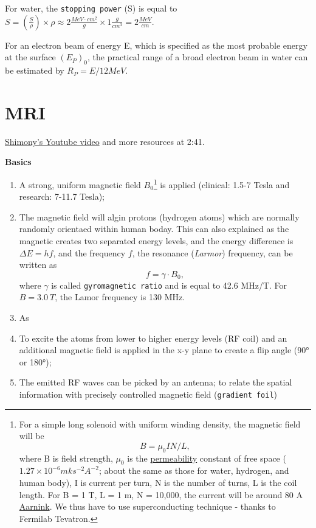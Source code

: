 \documentclass[]{book}
\providecommand{\tightlist}{%
  \setlength{\itemsep}{0pt}\setlength{\parskip}{0pt}}
\let\rmarkdownfootnote\footnote%
\def\footnote{\protect\rmarkdownfootnote}
\theoremstyle{definition}
\theoremstyle{definition}
\theoremstyle{definition}
\theoremstyle{remark}
\begin{document}
For water, the \texttt{stopping\ power} (S) is equal to
\(S = \left(\frac{S}{\rho}\right) \times \rho \approx 2 \frac{MeV\cdot {cm}^2}{g}\times 1 \frac{g}{cm^3} = 2 \frac{MeV}{cm}\).

For an electron beam of energy E, which is specified as the most
probable energy at the surface \((E_P)_0\), the practical range of a
broad electron beam in water can be estimated by \(R_P = E/12MeV\).

\section{MRI}\label{mri}

\href{https://www.youtube.com/watch?v=zf5oX01bRgk\&t=1147s}{Shimony's
Youtube video} and more resources at 2:41.

\textbf{Basics}

\begin{enumerate}
\def\labelenumi{\arabic{enumi}.}
\tightlist
\item
  A strong, uniform magnetic field \(B_0\)\footnote{For a simple long
    solenoid with uniform winding density, the magnetic field will be
    \[ B= \mu_0IN/L,\] where B is field strength, \(\mu_0\) is the
    \href{https://en.wikipedia.org/wiki/Permeability_(electromagnetism)}{permeability}
    constant of free space (\(1.27 \times 10^{-6} mks^{-2}A^{-2}\);
    about the same as those for water, hydrogen, and human body), I is
    current per turn, N is the number of turns, L is the coil length.
    For B = 1 T, L = 1 m, N = 10,000, the current will be around 80 A
    \href{https://www.europhysicsnews.org/articles/epn/pdf/2012/04/epn2012434p26.pdf}{Aarnink}.
    We thus have to use superconducting technique - thanks to Fermilab
    Tevatron.} is applied (clinical: 1.5-7 Tesla and research: 7-11.7
  Tesla);
\item
  The magnetic field will algin protons (hydrogen atoms) which are
  normally randomly orientaed within human boday. This can also
  explained as the magnetic creates two separated energy levels, and the
  energy difference is \(\Delta E = hf\), and the frequency \(f\), the
  resonance (\emph{Larmor}) frequency, can be written as
  \[f=\gamma \cdot B_0,\] where \(\gamma\) is called
  \texttt{gyromagnetic\ ratio} and is equal to 42.6 MHz/T. For
  \(B=3.0\ T\), the Lamor frequency is 130 MHz.
\item
  As
\item
  To excite the atoms from lower to higher energy levels (RF coil) and
  an additional magnetic field is applied in the x-y plane to create a
  flip angle (90° or 180°);
\item
  The emitted RF waves can be picked by an antenna; to relate the
  spatial information with precisely controlled magnetic field
  (\texttt{gradient\ foil})
\end{enumerate}
\end{document}
